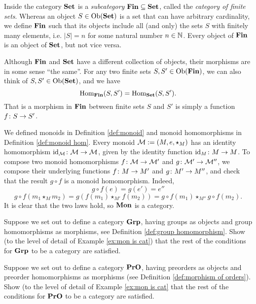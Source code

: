 \begin{example}\label{ex:Fin}

Inside the category ${\bf Set}$ is a {\em subcategory} ${\bf Fin}\subseteq{\bf Set}$, called the {\em category of finite sets}. Whereas an object $S\in\textnormal{Ob}({\bf Set})$ is a set that can have arbitrary cardinality, we define ${\bf Fin}$ such that its objects include all (and only) the sets $S$ with finitely many elements, i.e. $|S|=n$ for some natural number $n\in{\mathbb N}$. Every object of ${\bf Fin}$ is an object of ${\bf Set}$, but not vice versa.

Although ${\bf Fin}$ and ${\bf Set}$ have a different collection of objects, their morphisms are in some sense “the same”. For any two finite sets $S,S'\in\textnormal{Ob}({\bf Fin})$, we can also think of $S,S'\in\textnormal{Ob}({\bf Set})$, and we have
$$\textnormal{Hom}_{\bf Fin}(S,S')=\textnormal{Hom}_{\bf Set}(S,S').$$
That is a morphism in ${\bf Fin}$ between finite sets $S$ and $S'$ is simply a function $f\colon S\rightarrow S'$.

\end{example}

\begin{example}\label{ex:mon is cat}

We defined monoids in Definition \ref{def:monoid} and monoid homomorphisms in Definition \ref{def:monoid hom}. Every monoid $\mathcal{M}:=(M,e,\star_M)$ has an identity homomorphism $\textnormal{id}_\mathcal{M}\colon\mathcal{M}\rightarrow\mathcal{M}$, given by the identity function $\textnormal{id}_M\colon M\rightarrow M$. To compose two monoid homomorphisms $f\colon\mathcal{M}\rightarrow\mathcal{M}'$ and $g\colon\mathcal{M}'\rightarrow\mathcal{M}''$, we compose their underlying functions $f\colon M\rightarrow M'$ and $g\colon M'\rightarrow M''$, and check that the result $g\circ f$ is a monoid homomorphism. Indeed,
$$g\circ f(e)=g(e')=e''$$
$$g\circ f(m_1\star_Mm_2)=g(f(m_1)\star_{M'}f(m_2))=g\circ f(m_1)\star_{M''}g\circ f(m_2).$$
It is clear that the two laws hold, so ${\bf Mon}$ is a category.

\end{example}

\begin{exercise}
Suppose we set out to define a category ${\bf Grp}$, having groups as objects and group homomorphisms as morphisms, see Definition \ref{def:group homomorphism}. Show (to the level of detail of Example \ref{ex:mon is cat}) that the rest of the conditions for ${\bf Grp}$ to be a category are satisfied.
\end{exercise}

\begin{exercise}
Suppose we set out to define a category ${\bf PrO}$, having preorders as objects and preorder homomorphisms as morphisms (see Definition \ref{def:morphism of orders}). Show (to the level of detail of Example \ref{ex:mon is cat} that the rest of the conditions for ${\bf PrO}$ to be a category are satisfied.
\end{exercise}


